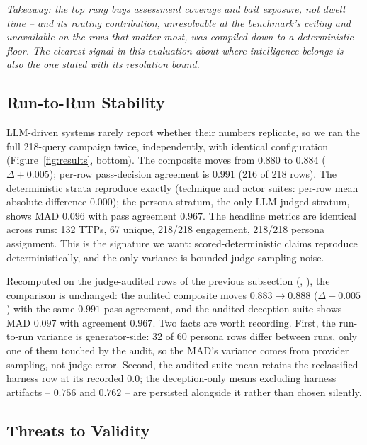 \emph{Takeaway: the top rung buys assessment coverage and bait exposure,
not dwell time -- and its routing contribution, unresolvable at the
benchmark's ceiling and unavailable on the rows that matter most, was
compiled down to a deterministic floor. The clearest signal in this
evaluation about where intelligence belongs is also the one stated with
its resolution bound.}

\subsection{Run-to-Run Stability}
\label{sec:stability}

LLM-driven systems rarely report whether their numbers replicate, so we
ran the full 218-query campaign twice, independently, with identical
configuration (Figure~\ref{fig:results}, bottom). The composite moves
from $0.880$ to $0.884$ ($\Delta
+0.005$); per-row pass-decision agreement is $0.991$ (216 of 218 rows).
The deterministic strata reproduce exactly (technique and actor suites:
per-row mean absolute difference $0.000$); the persona stratum, the only
LLM-judged stratum, shows MAD $0.096$ with pass agreement $0.967$. The
headline metrics are identical across runs: 132 TTPs, 67 unique,
218/218 engagement, 218/218 persona assignment. This is the signature we
want: scored-deterministic claims reproduce deterministically, and the
only variance is bounded judge sampling noise.

Recomputed on the judge-audited rows of the previous subsection
(, ), the
comparison is unchanged: the audited composite moves $0.883\to0.888$
($\Delta+0.005$) with the same $0.991$ pass agreement, and the audited
deception suite shows MAD $0.097$ with agreement $0.967$. Two facts are
worth recording. First, the run-to-run variance is generator-side: 32
of 60 persona rows differ between runs, only one of them touched by the
audit, so the MAD's variance comes from provider sampling, not judge
error. Second, the audited suite mean retains the reclassified harness
row at its recorded 0.0; the deception-only means excluding harness
artifacts -- $0.756$ and $0.762$ -- are persisted alongside it rather
than chosen silently.

\subsection{Threats to Validity}
\label{sec:threats}

